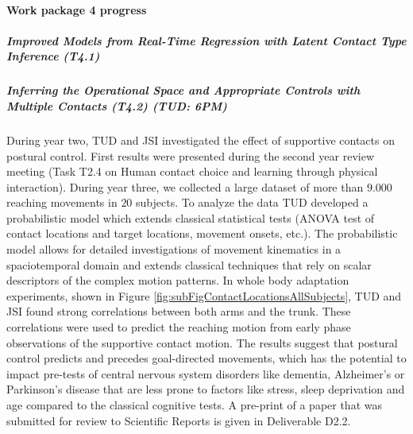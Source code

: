 

\paragraph{Work package 4 progress}

\subparagraph*{Improved Models from Real-Time Regression with Latent Contact Type Inference (T4.1)}



\subparagraph*{Inferring the Operational Space and Appropriate Controls with Multiple Contacts (T4.2) (TUD: 6PM)}%


During year two, TUD and JSI investigated the effect of supportive contacts on 
postural control. First results were presented during the second year review 
meeting (Task T2.4 on Human contact choice and learning through physical 
interaction). During year three, we collected a large dataset of more than 
$9.000$ reaching movements in $20$ subjects. To analyze the data TUD developed a 
probabilistic model which extends classical statistical tests (ANOVA test of 
contact locations and target locations, movement onsets, etc.). The 
probabilistic model allows for detailed investigations of movement kinematics in 
a spaciotemporal domain and extends classical techniques that rely on scalar 
descriptors of the complex motion patterns. In whole body adaptation 
experiments, shown in Figure \ref{fig:subFigContactLocationsAllSubjects}, TUD 
and JSI found strong correlations between both arms and the trunk. These 
correlations were used to predict the reaching motion from early phase 
observations of the supportive contact motion. The results suggest that postural 
control predicts and precedes goal-directed movements, which has the potential 
to impact pre-tests of central nervous system disorders like dementia, 
Alzheimer's or Parkinson's disease that are less prone to factors like stress, 
sleep deprivation and age compared to the classical cognitive tests. A pre-print 
of a paper that was submitted for review to Scientific Reports is given in 
Deliverable D2.2.


